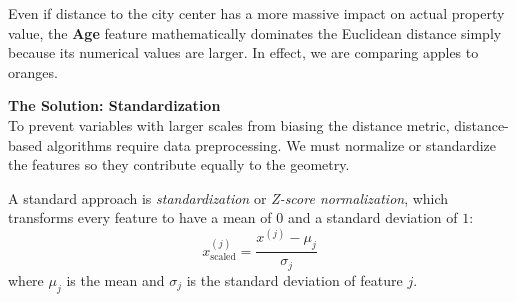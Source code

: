 \documentclass[12pt]{article}
\begin{document}
Even if distance to the city center has a more massive impact on
actual property value, the \textbf{Age} feature mathematically
dominates the Euclidean distance simply because its numerical
values are larger. In effect, we are comparing apples to oranges.

\vspace{0.3cm}
\noindent\textbf{The Solution: Standardization} \\
To prevent variables with larger scales from biasing the distance
metric, distance-based algorithms require data preprocessing.
We must normalize or standardize the features so they
contribute equally to the geometry.

A standard approach is \textit{standardization} or
\textit{Z-score normalization},
which transforms every feature to have a mean of $0$ and a
standard deviation of $1$:
\[
    x^{(j)}_{\text{scaled}} = \frac{x^{(j)} - \mu_j}{\sigma_j}
\]
where $\mu_j$ is the mean and $\sigma_j$ is the standard deviation of feature $j$.
\end{document}
